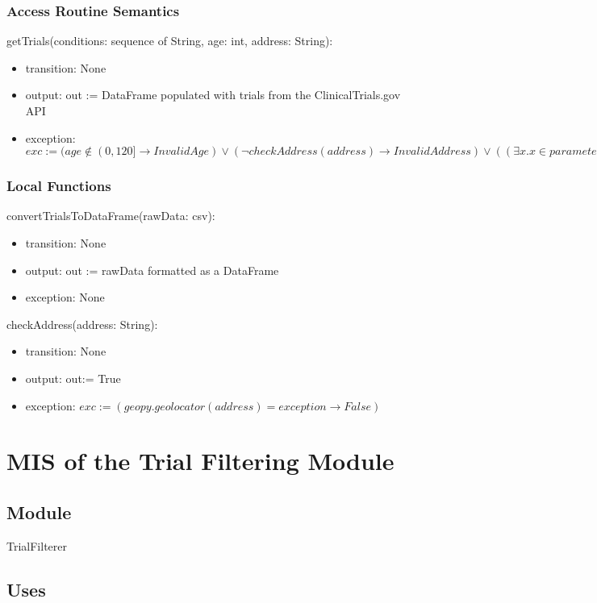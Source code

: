 \documentclass[12pt, titlepage]{article}
\begin{document}
\subsubsection{Access Routine Semantics}

\noindent getTrials(conditions: sequence of String, age: int, address: String):
\begin{itemize}
\item transition: None
\item output: out := DataFrame populated with trials from the ClinicalTrials.gov API
\item exception: $exc := (age \notin (0,120] \rightarrow InvalidAge) \lor (\neg checkAddress(address) \rightarrow InvalidAddress) \lor ((\exists x . x \in parameters : x = \varepsilon) \rightarrow MissingParameter)$
\end{itemize}

\subsubsection{Local Functions}
\noindent convertTrialsToDataFrame(rawData: csv):
\begin{itemize}
\item transition: None
\item output: out := rawData formatted as a DataFrame
\item exception: None
\end{itemize}

\noindent checkAddress(address: String):
\begin{itemize}
\item transition: None
\item output: out:= True
\item exception: $exc := (geopy.geolocator(address) = exception \rightarrow False)$
\end{itemize}


\section{MIS of the Trial Filtering Module} \label{User}

\subsection{Module}

TrialFilterer

\subsection{Uses}
\end{document}
